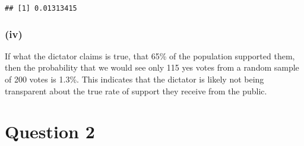 \documentclass[
]{article}
\begin{document}
\begin{verbatim}
## [1] 0.01313415
\end{verbatim}

\hypertarget{iv-1}{%
\subsubsection{(iv)}\label{iv-1}}

If what the dictator claims is true, that 65\% of the population
supported them, then the probability that we would see only 115 yes
votes from a random sample of 200 votes is 1.3\%. This indicates that
the dictator is likely not being transparent about the true rate of
support they receive from the public.

\hypertarget{question-2}{%
\section{Question 2}\label{question-2}}
\end{document}
